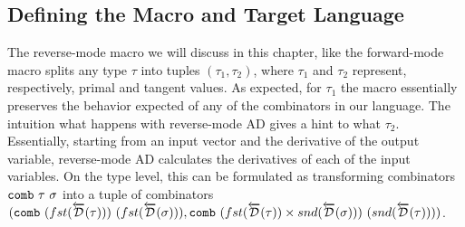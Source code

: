 \subsection{Defining the Macro and Target Language}\label{sec:combinator-macro}
  The reverse-mode macro we will discuss in this chapter, like the forward-mode macro splits any type $\tau$ into tuples $(\tau_1, \tau_2)$, where $\tau_1$ and $\tau_2$ represent, respectively, primal and tangent values.
  As expected, for $\tau_1$ the macro essentially preserves the behavior expected of any of the combinators in our language.
  The intuition what happens with reverse-mode AD gives a hint to what $\tau_2$.
  Essentially, starting from an input vector and the derivative of the output variable, reverse-mode AD calculates the derivatives of each of the input variables.
  On the type level, this can be formulated as transforming combinators $\texttt{comb}\ \tau\ \sigma$ into a tuple of combinators $(\texttt{comb}\ (fst(\overleftarrow{\mathcal{D}}(\tau)))\ (fst(\overleftarrow{\mathcal{D}}(\sigma))), \texttt{comb}\ (fst(\overleftarrow{\mathcal{D}}(\tau)) \times snd(\overleftarrow{\mathcal{D}}(\sigma)))\ (snd(\overleftarrow{\mathcal{D}}(\tau))))$.

